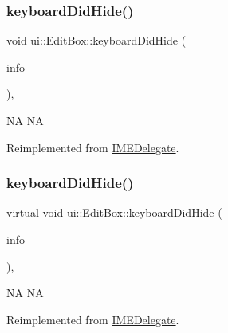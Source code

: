 \subsubsection{\texorpdfstring{keyboard\+Did\+Hide()}{keyboardDidHide()}\hspace{0.1cm}{\footnotesize\ttfamily [1/2]}}
{\footnotesize\ttfamily void ui\+::\+Edit\+Box\+::keyboard\+Did\+Hide (\begin{DoxyParamCaption}\item[{\hyperlink{structIMEKeyboardNotificationInfo}{I\+M\+E\+Keyboard\+Notification\+Info} \&}]{info }\end{DoxyParamCaption})\hspace{0.3cm}{\ttfamily [override]}, {\ttfamily [virtual]}}

NA  NA 

Reimplemented from \hyperlink{classIMEDelegate_a801b9cec4447e0f6418eae247afb7c72}{I\+M\+E\+Delegate}.

\mbox{\label{classui_1_1EditBox_a3898b6685b2693973a59d68c328952a0}} 
\subsubsection{\texorpdfstring{keyboard\+Did\+Hide()}{keyboardDidHide()}\hspace{0.1cm}{\footnotesize\ttfamily [2/2]}}
{\footnotesize\ttfamily virtual void ui\+::\+Edit\+Box\+::keyboard\+Did\+Hide (\begin{DoxyParamCaption}\item[{\hyperlink{structIMEKeyboardNotificationInfo}{I\+M\+E\+Keyboard\+Notification\+Info} \&}]{info }\end{DoxyParamCaption})\hspace{0.3cm}{\ttfamily [override]}, {\ttfamily [virtual]}}

NA  NA 

Reimplemented from \hyperlink{classIMEDelegate_a801b9cec4447e0f6418eae247afb7c72}{I\+M\+E\+Delegate}.

\mbox{\label{classui_1_1EditBox_a88c3e0a04a3857cacfc6cab7850fb8e0}} 
